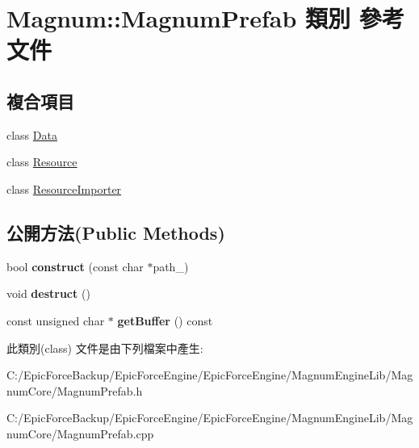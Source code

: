 \hypertarget{class_magnum_1_1_magnum_prefab}{}\section{Magnum\+:\+:Magnum\+Prefab 類別 參考文件}
\label{class_magnum_1_1_magnum_prefab}
\subsection*{複合項目}
\begin{DoxyCompactItemize}
\item 
class \hyperlink{class_magnum_1_1_magnum_prefab_1_1_data}{Data}
\item 
class \hyperlink{class_magnum_1_1_magnum_prefab_1_1_resource}{Resource}
\item 
class \hyperlink{class_magnum_1_1_magnum_prefab_1_1_resource_importer}{Resource\+Importer}
\end{DoxyCompactItemize}
\subsection*{公開方法(Public Methods)}
\begin{DoxyCompactItemize}
\item 
bool {\bfseries construct} (const char $\ast$path\+\_\+)\hypertarget{class_magnum_1_1_magnum_prefab_a263ad6cafa84552f40beffd12e077fad}{}\label{class_magnum_1_1_magnum_prefab_a263ad6cafa84552f40beffd12e077fad}

\item 
void {\bfseries destruct} ()\hypertarget{class_magnum_1_1_magnum_prefab_adbe3b9f45f9530f6c4696e255f8fda7c}{}\label{class_magnum_1_1_magnum_prefab_adbe3b9f45f9530f6c4696e255f8fda7c}

\item 
const unsigned char $\ast$ {\bfseries get\+Buffer} () const \hypertarget{class_magnum_1_1_magnum_prefab_aa1563fc0981a4b37c9c59adb81807184}{}\label{class_magnum_1_1_magnum_prefab_aa1563fc0981a4b37c9c59adb81807184}

\end{DoxyCompactItemize}


此類別(class) 文件是由下列檔案中產生\+:\begin{DoxyCompactItemize}
\item 
C\+:/\+Epic\+Force\+Backup/\+Epic\+Force\+Engine/\+Epic\+Force\+Engine/\+Magnum\+Engine\+Lib/\+Magnum\+Core/Magnum\+Prefab.\+h\item 
C\+:/\+Epic\+Force\+Backup/\+Epic\+Force\+Engine/\+Epic\+Force\+Engine/\+Magnum\+Engine\+Lib/\+Magnum\+Core/Magnum\+Prefab.\+cpp\end{DoxyCompactItemize}
